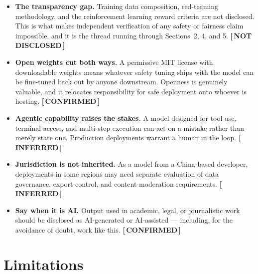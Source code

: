 \documentclass[11pt,a4paper]{article}
\newcommand{\tg}[2]{{\scriptsize\sffamily\bfseries\color{#1}[\,#2\,]}}
\newcommand{\Conf}{\tg{moss}{CONFIRMED}}
\newcommand{\Infr}{\tg{clay}{INFERRED}}
\newcommand{\Undi}{\tg{stone}{NOT DISCLOSED}}
\begin{document}
\begin{itemize}
  \item \textbf{The transparency gap.} Training data composition, red-teaming methodology, and
        the reinforcement learning reward criteria are not disclosed. This is what makes
        independent verification of any safety or fairness claim impossible, and it is the thread
        running through Sections~2, 4, and 5. \Undi
  \item \textbf{Open weights cut both ways.} A permissive MIT license with downloadable weights
        means whatever safety tuning ships with the model can be fine-tuned back out by anyone
        downstream. Openness is genuinely valuable, and it relocates responsibility for safe
        deployment onto whoever is hosting. \Conf
  \item \textbf{Agentic capability raises the stakes.} A model designed for tool use, terminal
        access, and multi-step execution can act on a mistake rather than merely state one.
        Production deployments warrant a human in the loop. \Infr
  \item \textbf{Jurisdiction is not inherited.} As a model from a China-based developer,
        deployments in some regions may need separate evaluation of data governance,
        export-control, and content-moderation requirements. \Infr
  \item \textbf{Say when it is AI.} Output used in academic, legal, or journalistic work should be
        disclosed as AI-generated or AI-assisted --- including, for the avoidance of doubt, work
        like this. \Conf
\end{itemize}

\section{Limitations}
\end{document}
